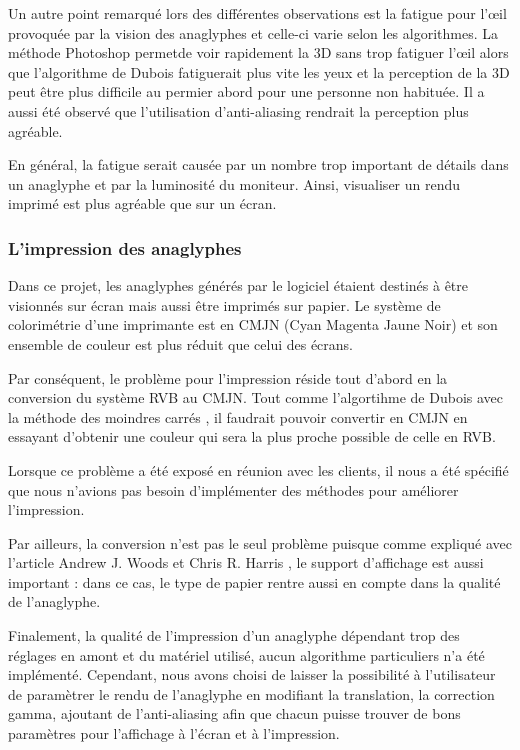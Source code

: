 Un autre point remarqué lors des différentes observations est la fatigue pour l'\oe il provoquée par la vision des anaglyphes et celle-ci varie selon les algorithmes. La méthode Photoshop permetde voir rapidement la 3D sans trop fatiguer l'\oe il alors que  l'algorithme de Dubois fatiguerait plus vite les yeux et la perception de la 3D peut être plus difficile au permier abord pour une personne non habituée. Il a aussi été observé que l'utilisation d'anti-aliasing rendrait la perception plus agréable. 

En général, la fatigue serait causée par un nombre trop important de détails dans un anaglyphe et par la luminosité du moniteur. Ainsi, visualiser un rendu imprimé est plus agréable que sur un écran.

\subsubsection{L'impression des anaglyphes}
Dans ce projet, les anaglyphes générés par le logiciel étaient destinés à être visionnés sur écran mais aussi être imprimés sur papier. Le système de colorimétrie d'une imprimante est en CMJN (Cyan Magenta Jaune Noir) et son ensemble de couleur est plus réduit que celui des écrans. 


Par conséquent, le problème pour l'impression réside tout d'abord en la conversion du système RVB au CMJN. Tout comme l'algortihme de Dubois avec la méthode des moindres carrés \cite{algoDubois}, il faudrait pouvoir convertir en CMJN en essayant d'obtenir une couleur qui sera la plus proche possible de celle en RVB. 

Lorsque ce problème a été exposé en réunion avec les clients, il nous a été spécifié que nous n'avions pas besoin d'implémenter des méthodes pour améliorer l'impression. 

Par ailleurs, la conversion n'est pas le seul problème puisque comme expliqué avec l'article Andrew J. Woods et Chris R. Harris \cite{anaglypheDefaut}, le support d'affichage est aussi important : dans ce cas, le type de papier rentre aussi en compte dans la qualité de l'anaglyphe.

Finalement, la qualité de l'impression d'un anaglyphe dépendant trop des réglages en amont et du matériel utilisé, aucun algorithme particuliers n'a été implémenté. Cependant, nous avons choisi de laisser la possibilité à l'utilisateur de paramètrer le rendu de l'anaglyphe en modifiant la translation, la correction gamma, ajoutant de l'anti-aliasing afin que chacun puisse trouver de bons paramètres pour l'affichage à l'écran et à l'impression.
